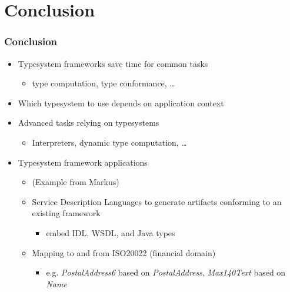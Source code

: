 \section{Conclusion}

\begin{frame}
  \frametitle{Conclusion}
  
  
  \begin{itemize}
    \item Typesystem frameworks save time for common tasks
    \begin{itemize}
      \item type computation, type conformance, \ldots
    \end{itemize}
    \item Which typesystem to use depends on application context
    \item Advanced tasks relying on typesystems
    \begin{itemize}
      \item Interpreters, dynamic type computation, \ldots
    \end{itemize}
    \item Typesystem framework applications
    \begin{itemize}
      \item (Example from Markus)
      \item Service Description Languages to generate artifacts conforming
      to an existing framework
      \begin{itemize}
        \item embed IDL, WSDL, and Java types
      \end{itemize}
      \item Mapping to and from ISO20022 (financial domain)
      \begin{itemize}
        \item e.g. \emph{PostalAddress6} based on \emph{PostalAddress},
        \emph{Max140Text} based on \emph{Name}
      \end{itemize}
    \end{itemize}
  \end{itemize}
  
\end{frame}

